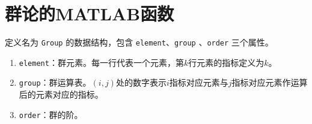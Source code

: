 % 

% 

\chapter{群论的MATLAB函数}

定义名为 \lstinline{Group} 的数据结构，包含 \lstinline{element}、\lstinline{group} 、\lstinline{order} 三个属性。

\begin{enumerate}
	\item \lstinline{element}：群元素。每一行代表一个元素，第$k$行元素的指标定义为$k$。
	\item \lstinline{group}：群运算表。$(i,j)$处的数字表示$i$指标对应元素与$j$指标对应元素作运算后的元素对应的指标。
	\item \lstinline{order}：群的阶。
\end{enumerate}

